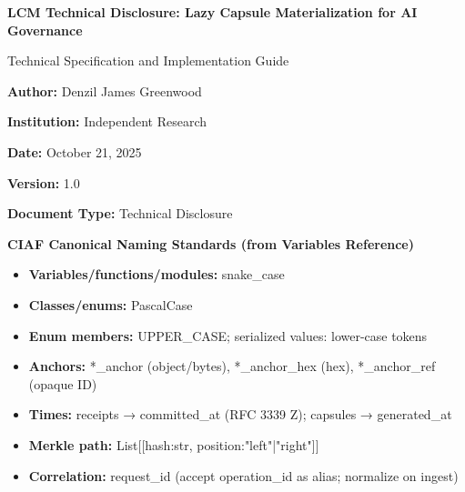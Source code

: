 \documentclass[12pt,a4paper]{article}
\begin{document}
\begin{titlepage}
\centering
\vspace*{2cm}

{\Huge\bfseries LCM Technical Disclosure: Lazy Capsule Materialization for AI Governance\par}
\vspace{1cm}
{\Large Technical Specification and Implementation Guide\par}
\vspace{2cm}

{\Large\textbf{Author:} Denzil James Greenwood\par}
\vspace{0.5cm}
{\large\textbf{Institution:} Independent Research\par}
\vspace{0.5cm}
{\large\textbf{Date:} October 21, 2025\par}
\vspace{0.5cm}
{\large\textbf{Version:} 1.0\par}
\vspace{0.5cm}
{\large\textbf{Document Type:} Technical Disclosure\par}

\vfill

\begin{center}
\end{center}

\vspace{0.5cm}

\begin{technicalbox}
\textbf{CIAF Canonical Naming Standards (from Variables Reference)}
\begin{itemize}
\item \textbf{Variables/functions/modules:} snake\_case
\item \textbf{Classes/enums:} PascalCase  
\item \textbf{Enum members:} UPPER\_CASE; serialized values: lower-case tokens
\item \textbf{Anchors:} *\_anchor (object/bytes), *\_anchor\_hex (hex), *\_anchor\_ref (opaque ID)
\item \textbf{Times:} receipts → committed\_at (RFC 3339 Z); capsules → generated\_at
\item \textbf{Merkle path:} List[[hash:str, position:"left"|"right"]]
\item \textbf{Correlation:} request\_id (accept operation\_id as alias; normalize on ingest)
\end{itemize}
\end{technicalbox}


\end{titlepage}
\end{document}
